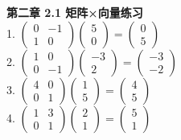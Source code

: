 \documentclass[a4paper,12pt]{ctexart}
\begin{document}
\noindent\textbf{第二章 2.1 矩阵×向量练习}\\
1. $\begin{pmatrix}0&-1\\1&0\end{pmatrix}\begin{pmatrix}5\\0\end{pmatrix}=\begin{pmatrix}0\\5\end{pmatrix}$\\
2. $\begin{pmatrix}1&0\\0&-1\end{pmatrix}\begin{pmatrix}-3\\2\end{pmatrix}=\begin{pmatrix}-3\\-2\end{pmatrix}$\\
3. $\begin{pmatrix}4&0\\0&1\end{pmatrix}\begin{pmatrix}1\\5\end{pmatrix}=\begin{pmatrix}4\\5\end{pmatrix}$\\
4. $\begin{pmatrix}1&3\\0&1\end{pmatrix}\begin{pmatrix}2\\1\end{pmatrix}=\begin{pmatrix}5\\1\end{pmatrix}$\\
\end{document}
